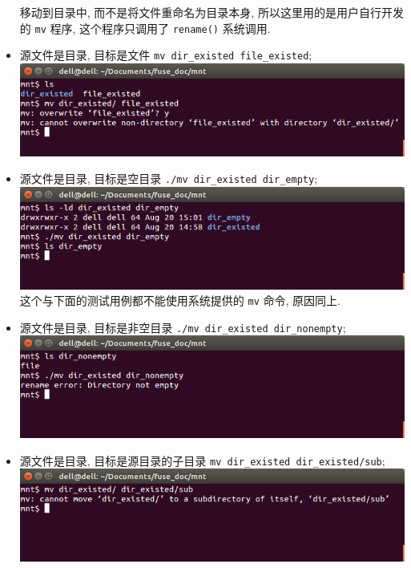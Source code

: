 \documentclass[nofonts, titlepage]{ctexart}
\begin{document}
\begin{itemize}
  移动到目录中, 而不是将文件重命名为目录本身, 所以这里用的是用户自行开发
  的 \verb'mv' 程序, 这个程序只调用了 \verb'rename()' 系统调用.
\item
  源文件是目录, 目标是文件 \texttt{mv dir\_existed file\_existed};\\
  \includegraphics[width=14cm]{./images/./mv_t5.png}
\item
  源文件是目录, 目标是空目录 \texttt{./mv dir\_existed dir\_empty};\\
  \includegraphics[width=14cm]{./images/./mv_t6.png} \\
  这个与下面的测试用例都不能使用系统提供的 \verb'mv' 命令, 原因同上.
\item
  源文件是目录, 目标是非空目录
  \texttt{./mv dir\_existed dir\_nonempty};\\
  \includegraphics[width=14cm]{./images/./mv_t7.png}
\item
  源文件是目录, 目标是源目录的子目录
  \texttt{mv dir\_existed dir\_existed/sub};\\
  \includegraphics[width=14cm]{./images/./mv_t8.png}
\end{itemize}
\end{document}
